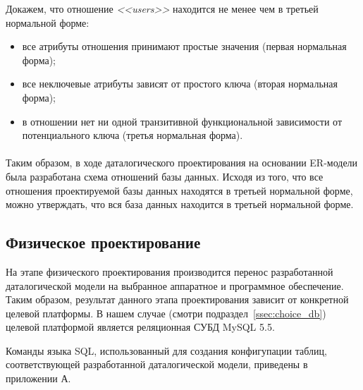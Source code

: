 Докажем, что отношение \textit{<<users>>} находится не менее чем в третьей нормальной форме:
\begin{itemize}
\item
  все атрибуты отношения принимают простые значения (первая нормальная форма);
\item
  все неключевые атрибуты зависят от простого ключа
  (вторая нормальная форма); 
\item
  в отношении нет ни одной транзитивной функциональной зависимости от потенциального ключа
  (третья нормальная форма).
\end{itemize}

\paragraph{}
Таким образом, в ходе даталогического проектирования на основании ER-модели была разработана схема 
отношений базы данных.
Исходя из того, что все отношения проектируемой базы данных находятся в третьей нормальной форме,
можно утверждать, что вся база данных находится в третьей нормальной форме.


\subsection{Физическое проектирование}
\label{ssub:db_physical_stage}

На этапе физического проектирования производится перенос разработанной даталогической модели
на выбранное аппаратное и программное обеспечение.
Таким образом, результат данного этапа проектирования зависит от конкретной целевой платформы.
В нашем случае (смотри подраздел~\ref{ssec:choice_db}) целевой платформой является
реляционная СУБД MySQL 5.5.

Команды языка SQL, использованный для создания конфигупации таблиц,
соответствующей разработанной даталогической модели, 
приведены в приложении А.
